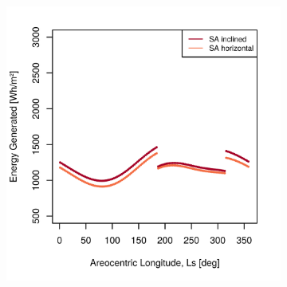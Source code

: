 \begin{figure}[h]
\captionsetup[subfigure]{justification=centering}
\vspace{-2ex}
	\centering
    \setlength{\subfigureWidth}{0.50\textwidth}
    \setlength{\graphicsHeight}{80mm}
    \hypersetup{hidelinks=true}%
    \begin{subfigure}[t]{\subfigureWidth}
        \centering
        \includegraphics[height=\graphicsHeight]{sections/design/solar-array/plots/ianichaos-daily-generated-energy-for-solar-cell-coverage-area-23m2.png}
        \label{fig:plot:sub:iani-chaos-generated-energy}
    \end{subfigure}\hfill
    \begin{subfigure}[t]{\subfigureWidth}
        \centering

\end{subfigure}
\end{figure}
